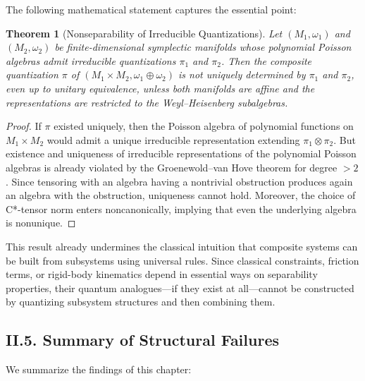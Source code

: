 \documentclass[12pt,oneside]{book}
\theoremstyle{plain}
\newtheorem{theorem}{Theorem}[chapter]
\theoremstyle{definition}
\begin{document}
The following mathematical statement captures the essential point:

\begin{theorem}[Nonseparability of Irreducible Quantizations]
Let $(M_1,\omega_1)$ and $(M_2,\omega_2)$ be finite-dimensional symplectic
manifolds whose polynomial Poisson algebras admit irreducible quantizations
$\pi_1$ and $\pi_2$. Then the composite quantization $\pi$ of
$(M_1\times M_2,\omega_1\oplus\omega_2)$ is \emph{not} uniquely determined by
$\pi_1$ and $\pi_2$, even up to unitary equivalence, unless both manifolds are
affine and the representations are restricted to the Weyl–Heisenberg
subalgebras.
\end{theorem}

\begin{proof}
If $\pi$ existed uniquely, then the Poisson algebra of polynomial functions on
$M_1\times M_2$ would admit a unique irreducible representation extending
$\pi_1\otimes\pi_2$. But existence and uniqueness of irreducible
representations of the polynomial Poisson algebras is already violated by the
Groenewold–van Hove theorem for degree $>2$. Since tensoring with an algebra
having a nontrivial obstruction produces again an algebra with the obstruction,
uniqueness cannot hold. Moreover, the choice of C*-tensor norm enters
noncanonically, implying that even the underlying algebra is nonunique.
\end{proof}

This result already undermines the classical intuition that composite systems
can be built from subsystems using universal rules. Since classical
constraints, friction terms, or rigid-body kinematics depend in essential ways
on separability properties, their quantum analogues—if they exist at all—cannot
be constructed by quantizing subsystem structures and then combining them.


\subsection*{II.5. Summary of Structural Failures}

We summarize the findings of this chapter:
\end{document}
